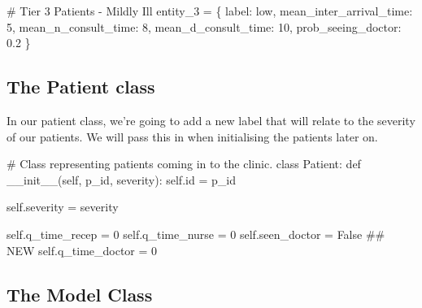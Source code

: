 \documentclass[
  letterpaper,
  DIV=11,
  numbers=noendperiod]{scrreprt}
\newenvironment{Shaded}{}{}
\newcommand{\BuiltInTok}[1]{\textcolor[rgb]{0.84,0.23,0.29}{#1}}
\newcommand{\CommentTok}[1]{\textcolor[rgb]{0.42,0.45,0.49}{#1}}
\newcommand{\DecValTok}[1]{\textcolor[rgb]{0.00,0.36,0.77}{#1}}
\newcommand{\FloatTok}[1]{\textcolor[rgb]{0.00,0.36,0.77}{#1}}
\newcommand{\FunctionTok}[1]{\textcolor[rgb]{0.44,0.26,0.76}{#1}}
\newcommand{\KeywordTok}[1]{\textcolor[rgb]{0.84,0.23,0.29}{#1}}
\newcommand{\NormalTok}[1]{\textcolor[rgb]{0.14,0.16,0.18}{#1}}
\newcommand{\OperatorTok}[1]{\textcolor[rgb]{0.14,0.16,0.18}{#1}}
\newcommand{\StringTok}[1]{\textcolor[rgb]{0.01,0.18,0.38}{#1}}
\newcommand{\VariableTok}[1]{\textcolor[rgb]{0.89,0.38,0.04}{#1}}
\begin{document}
\begin{Shaded}
\begin{Highlighting}[]
    \CommentTok{\# Tier 3 Patients {-} Mildly Ill}
\NormalTok{    entity\_3 }\OperatorTok{=}\NormalTok{ \{}
        \StringTok{\textquotesingle{}label\textquotesingle{}}\NormalTok{: }\StringTok{\textquotesingle{}low\textquotesingle{}}\NormalTok{,}
        \StringTok{\textquotesingle{}mean\_inter\_arrival\_time\textquotesingle{}}\NormalTok{: }\DecValTok{5}\NormalTok{,}
        \StringTok{\textquotesingle{}mean\_n\_consult\_time\textquotesingle{}}\NormalTok{: }\DecValTok{8}\NormalTok{,}
        \StringTok{\textquotesingle{}mean\_d\_consult\_time\textquotesingle{}}\NormalTok{: }\DecValTok{10}\NormalTok{,}
        \StringTok{\textquotesingle{}prob\_seeing\_doctor\textquotesingle{}}\NormalTok{: }\FloatTok{0.2}
\NormalTok{    \}}
\end{Highlighting}
\end{Shaded}

\subsection{The Patient class}\label{the-patient-class-4}

In our patient class, we're going to add a new label that will relate to
the severity of our patients. We will pass this in when initialising the
patients later on.

\begin{Shaded}
\begin{Highlighting}[]
\CommentTok{\# Class representing patients coming in to the clinic.}
\KeywordTok{class}\NormalTok{ Patient:}
    \KeywordTok{def} \FunctionTok{\_\_init\_\_}\NormalTok{(}\VariableTok{self}\NormalTok{, p\_id, severity):}
        \VariableTok{self}\NormalTok{.}\BuiltInTok{id} \OperatorTok{=}\NormalTok{ p\_id}

        \VariableTok{self}\NormalTok{.severity }\OperatorTok{=}\NormalTok{ severity}

        \VariableTok{self}\NormalTok{.q\_time\_recep }\OperatorTok{=} \DecValTok{0}
        \VariableTok{self}\NormalTok{.q\_time\_nurse }\OperatorTok{=} \DecValTok{0}
        \VariableTok{self}\NormalTok{.seen\_doctor }\OperatorTok{=} \VariableTok{False} \CommentTok{\#\# NEW}
        \VariableTok{self}\NormalTok{.q\_time\_doctor }\OperatorTok{=} \DecValTok{0}
\end{Highlighting}
\end{Shaded}

\subsection{The Model Class}\label{the-model-class-4}
\end{document}
